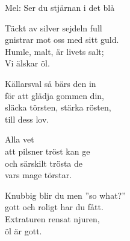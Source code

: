 \begin{SongText}[Vi älskar öl]
    \begin{SongInfo}
        Mel: Ser du stjärnan i det blå
    \end{SongInfo}
    \begin{SongVerse}
        Täckt av silver sejdeln full\\%
        gnistrar mot oss med sitt guld.\\%
        Humle, malt, är livets salt;\\%
        Vi älskar öl.
    \end{SongVerse}
    \begin{SongVerse}
        Källarsval så bärs den in\\%
        för att glädja gommen din,\\%
        släcka törsten, stärka rösten,\\%
        till dess lov.
    \end{SongVerse}
    \begin{SongVerse}
        Alla vet\\%
        att pilsner tröst kan ge\\%
        och särskilt trösta de\\%
        vars mage törstar.
    \end{SongVerse}
    \begin{SongVerse}
        Knubbig blir du men ”so what?”\\%
        gott och roligt har du fått.\\%
        Extraturen rensat njuren,\\%
        öl är gott.
    \end{SongVerse}
\end{SongText}

